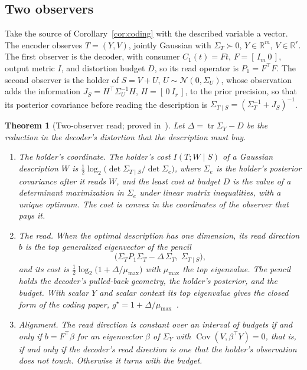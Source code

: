 \documentclass[11pt]{article}
\newtheorem{theorem}{Theorem}
\theoremstyle{definition}
\theoremstyle{remark}
\newcommand{\R}{\mathbb{R}}
\newcommand{\tr}{\operatorname{tr}}
\newcommand{\Cov}{\operatorname{Cov}}
\begin{document}
\subsection{Two observers}

Take the source of Corollary~\ref{cor:coding} with the described variable a vector.
The encoder observes $T=(Y,V)$, jointly Gaussian with $\Sigma_{T}\succ0$, $Y\in\R^{m}$, $V\in\R^{r}$.
The first observer is the decoder, with consumer $C_{1}(t)=Ft$, $F=[\,I_{m}\ 0\,]$, output metric $I$, and distortion budget $D$, so its read operator is $P_{1}=F^{\top}F$.
The second observer is the holder of $S=V+U$, $U\sim\mathcal{N}(0,\Sigma_{U})$, whose observation adds the information $J_{S}=H^{\top}\Sigma_{U}^{-1}H$, $H=[\,0\ I_{r}\,]$, to the prior precision, so that its posterior covariance before reading the description is $\Sigma_{T\mid S}=(\Sigma_{T}^{-1}+J_{S})^{-1}$.

\begin{theorem}[Two-observer read; proved in~\cite{bond2026vector}]
\label{thm:twoobs}
Let $\Delta=\tr\Sigma_{Y}-D$ be the reduction in the decoder's distortion that the description must buy.
\begin{enumerate}
\item[(a)] \emph{The holder's coordinate.} The holder's cost $I(T;W\mid S)$ of a Gaussian description $W$ is $\tfrac12\log_{2}\bigl(\det\Sigma_{T\mid S}/\det\Sigma_{e}\bigr)$, where $\Sigma_{e}$ is the holder's posterior covariance after it reads $W$, and the least cost at budget $D$ is the value of a determinant maximization in $\Sigma_{e}$ under linear matrix inequalities, with a unique optimum.
The cost is convex in the coordinates of the observer that pays it.
\item[(b)] \emph{The read.} When the optimal description has one dimension, its read direction $b$ is the top generalized eigenvector of the pencil
\[
\bigl(\Sigma_{T}P_{1}\Sigma_{T}-\Delta\,\Sigma_{T},\ \Sigma_{T\mid S}\bigr),
\]
and its cost is $\tfrac12\log_{2}\bigl(1+\Delta/\mu_{\max}\bigr)$ with $\mu_{\max}$ the top eigenvalue.
The pencil holds the decoder's pulled-back geometry, the holder's posterior, and the budget.
With scalar $Y$ and scalar context its top eigenvalue gives the closed form of the coding paper, $g^\star=1+\Delta/\mu_{\max}$~\cite[Proposition~24]{bond2026tit}.
\item[(c)] \emph{Alignment.} The read direction is constant over an interval of budgets if and only if $b=F^{\top}\beta$ for an eigenvector $\beta$ of $\Sigma_{Y}$ with $\Cov(V,\beta^{\top}Y)=0$, that is, if and only if the decoder's read direction is one that the holder's observation does not touch.
Otherwise it turns with the budget.
\end{enumerate}
\end{theorem}
\end{document}

